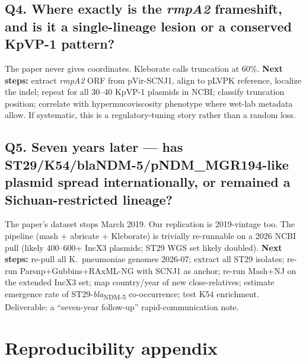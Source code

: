 \documentclass[11pt,letterpaper]{article}
\begin{document}
\subsection*{Q4. Where exactly is the \textit{rmpA2} frameshift, and is it a single-lineage lesion or a conserved KpVP-1 pattern?}
The paper never gives coordinates. Kleborate calls truncation at 60\%. \textbf{Next steps:} extract \textit{rmpA2} ORF from pVir-SCNJ1, align to pLVPK reference, localize the indel; repeat for all 30--40 KpVP-1 plasmids in NCBI; classify truncation position; correlate with hypermucoviscosity phenotype where wet-lab metadata allow. If systematic, this is a regulatory-tuning story rather than a random loss.

\subsection*{Q5. Seven years later --- has ST29/K54/blaNDM-5/pNDM\_MGR194-like plasmid spread internationally, or remained a Sichuan-restricted lineage?}
The paper's dataset stops March 2019. Our replication is 2019-vintage too. The pipeline (mash + abricate + Kleborate) is trivially re-runnable on a 2026 NCBI pull (likely 400--600+ IncX3 plasmids; ST29 WGS set likely doubled). \textbf{Next steps:} re-pull all K.\ pneumoniae genomes 2026-07; extract all ST29 isolates; re-run Parsnp+Gubbins+RAxML-NG with SCNJ1 as anchor; re-run Mash+NJ on the extended IncX3 set; map country/year of new close-relatives; estimate emergence rate of ST29-\textit{bla}\textsubscript{NDM-5} co-occurrence; test K54 enrichment. Deliverable: a ``seven-year follow-up'' rapid-communication note.

\section{Reproducibility appendix}
\end{document}
